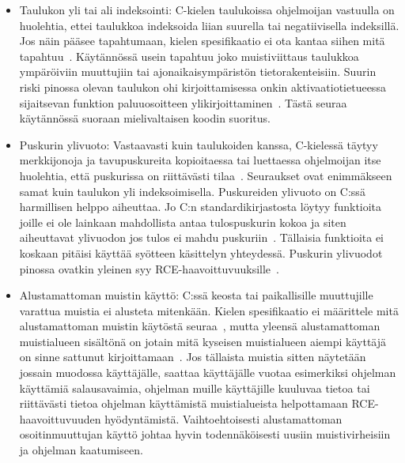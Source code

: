 \begin{itemize}
    \item Taulukon yli tai ali indeksointi: C-kielen taulukoissa ohjelmoijan vastuulla on huolehtia,
          ettei taulukkoa indeksoida liian suurella tai negatiivisella indeksillä.
          Jos näin pääsee tapahtumaan, kielen spesifikaatio ei ota kantaa siihen mitä tapahtuu~\cite[\S 6.5.6]{CSpec}.
          Käytännössä usein tapahtuu joko muistiviittaus taulukkoa ympäröiviin muuttujiin tai
          ajonaikaisympäristön tietorakenteisiin.
          Suurin riski pinossa olevan taulukon ohi kirjoittamisessa onkin aktivaatiotietueessa
          sijaitsevan funktion paluuosoitteen ylikirjoittaminen~\cite{StaticallyDetecting,SplintLCLint}.
          Tästä seuraa käytännössä suoraan mielivaltaisen koodin suoritus.
    \item Puskurin ylivuoto: Vastaavasti kuin taulukoiden kanssa, 
          C-kielessä täytyy merkkijonoja ja tavupuskureita kopioitaessa tai luettaessa
          ohjelmoijan itse huolehtia, että puskurissa on riittävästi tilaa~\cite[\S 7.24.1]{CSpec}.
          Seuraukset ovat enimmäkseen samat kuin taulukon yli indeksoimisella.
          Puskureiden ylivuoto on C:ssä harmillisen helppo aiheuttaa.
          Jo C:n standardikirjastosta löytyy funktioita joille ei ole lainkaan mahdollista antaa tulospuskurin
          kokoa ja siten aiheuttavat ylivuodon jos tulos ei mahdu puskuriin~\cite{StaticallyDetecting,SplintLCLint}.
          Tällaisia funktioita ei koskaan pitäisi käyttää syötteen käsittelyn yhteydessä.
          Puskurin ylivuodot pinossa ovatkin yleinen syy RCE-haavoittuvuuksille~\cite{SplintLCLint}.
    \item Alustamattoman muistin käyttö: C:ssä keosta tai paikallisille muuttujille
          varattua muistia ei alusteta mitenkään.
          Kielen spesifikaatio ei määrittele mitä alustamattoman muistin käytöstä seuraa~\cite[\S 6.3.2.1 ja \S 7.22.3.4]{CSpec},
          mutta yleensä alustamattoman muistialueen sisältönä on jotain mitä kyseisen muistialueen aiempi käyttäjä on
          sinne sattunut kirjoittamaan~\cite{SecurityRootOfTheProblem}.
%
          Jos tällaista muistia sitten näytetään jossain muodossa käyttäjälle,
          saattaa käyttäjälle vuotaa esimerkiksi ohjelman käyttämiä salausavaimia,
          ohjelman muille käyttäjille kuuluvaa tietoa tai
          riittävästi tietoa ohjelman käyttämistä muistialueista helpottamaan RCE-haavoittuvuuden hyödyntämistä.
          Vaihtoehtoisesti alustamattoman osoitinmuuttujan käyttö johtaa hyvin todennäköisesti uusiin muistivirheisiin
          ja ohjelman kaatumiseen.

\end{itemize}
